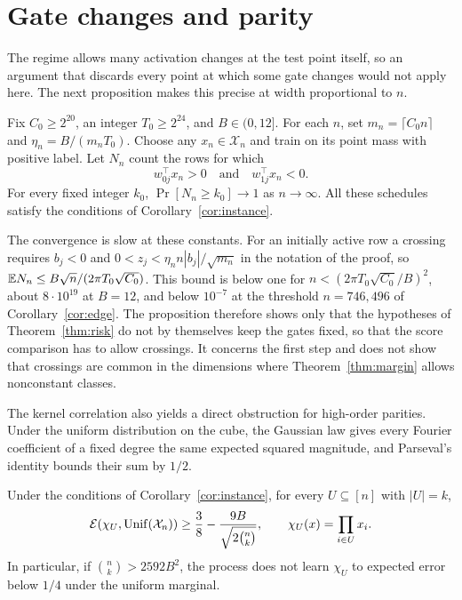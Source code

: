\documentclass[11pt,letterpaper,pmlr,twoside]{jmlr}
\newcommand{\X}{\mathcal X}\newcommand{\Hc}{\mathcal H}
\begin{document}
\section{Gate changes and parity}
\label{sec:gates}
The regime allows many activation changes at the test point itself, so an argument that discards every point at which some gate changes would not apply here. The next proposition makes this precise at width proportional to $n$.

\begin{proposition}
\label{prop:crossings}
Fix $C_0\ge2^{20}$, an integer $T_0\ge2^{24}$, and $B\in(0,12]$. For each $n$, set $m_n=\lceil C_0n\rceil$ and $\eta_n=B/(m_nT_0)$. Choose any $x_n\in\X_n$ and train on its point mass with positive label. Let $N_n$ count the rows for which
\[
 w_{0j}^\top x_n>0\quad\text{and}\quad w_{1j}^\top x_n<0.
\]
For every fixed integer $k_0$, $\Pr[N_n\ge k_0]\to1$ as $n\to\infty$. All these schedules satisfy the conditions of Corollary~\ref{cor:instance}.
\end{proposition}

The convergence is slow at these constants. For an initially active row a crossing requires $b_j<0$ and $0<z_j<\eta_nn|b_j|/\sqrt{m_n}$ in the notation of the proof, so $\mathbb E N_n\le B\sqrt n/(2\pi T_0\sqrt{C_0})$. This bound is below one for $n<(2\pi T_0\sqrt{C_0}/B)^2$, about $8\cdot10^{19}$ at $B=12$, and below $10^{-7}$ at the threshold $n=746{,}496$ of Corollary~\ref{cor:edge}. The proposition therefore shows only that the hypotheses of Theorem~\ref{thm:risk} do not by themselves keep the gates fixed, so that the score comparison has to allow crossings. It concerns the first step and does not show that crossings are common in the dimensions where Theorem~\ref{thm:margin} allows nonconstant classes.

The kernel correlation also yields a direct obstruction for high-order parities. Under the uniform distribution on the cube, the Gaussian law gives every Fourier coefficient of a fixed degree the same expected squared magnitude, and Parseval's identity bounds their sum by $1/2$.

\begin{corollary}
\label{cor:parity}
Under the conditions of Corollary~\ref{cor:instance}, for every $U\subseteq[n]$ with $|U|=k$,
\begin{equation}
 \Risk(\chi_U,\Unif(\X_n))
 \ge\frac38-\frac{9B}{\sqrt{2\binom nk}},
 \qquad \chi_U(x)=\prod_{i\in U}x_i.
 \label{eq:parity}
\end{equation}
In particular, if $\binom nk>2592B^2$, the process does not learn $\chi_U$ to expected error below $1/4$ under the uniform marginal.
\end{corollary}
\end{document}
